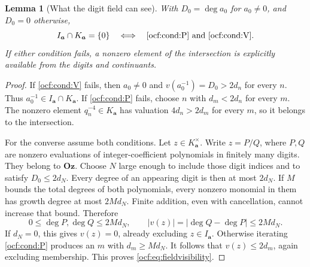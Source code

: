 \documentclass[11pt,a4paper]{article}
\numberwithin{equation}{section}
\newtheorem{lemma}[theorem]{Lemma}
\theoremstyle{definition}
\theoremstyle{remark}
\newcommand{\Oz}{\mathbf{Oz}}
\newcommand{\dgr}{\operatorname{deg}}
\newcommand{\codea}{\boldsymbol a}
\begin{document}
\begin{lemma}[What the digit field can see]\label{ocf:lem:digitfield}
With $D_0=\dgr a_0$ for $a_0\ne0$, and $D_0=0$ otherwise,
\begin{equation}\label{ocf:eq:fieldvisibility}
 I_{\codea}\cap K_{\codea}=\{0\}
 \quad\Longleftrightarrow\quad
 \eqref{ocf:cond:P}\text{ and }\eqref{ocf:cond:V}.
\end{equation}
If either condition fails, a nonzero element of the intersection is
explicitly available from the digits and continuants.
\end{lemma}
\begin{proof}
If \eqref{ocf:cond:V} fails, then $a_0\ne0$ and
$v(a_0^{-1})=D_0>2d_n$ for every $n$. Thus $a_0^{-1}\in I_{\codea}\cap
K_{\codea}$.
If \eqref{ocf:cond:P} fails, choose $n$ with $d_m<2d_n$ for every $m$.
The nonzero element $q_n^{-4}\in K_{\codea}$ has valuation $4d_n>2d_m$
for every $m$, so it belongs to the intersection.

For the converse assume both conditions. Let $z\in K_{\codea}^\times$.
Write $z=P/Q$, where $P,Q$ are nonzero evaluations of integer-coefficient
polynomials in finitely many digits. They belong to $\Oz$. Choose $N$
large enough to include those digit indices and to satisfy $D_0\le2d_N$.
Every degree of an appearing digit is then at most $2d_N$.
If $M$ bounds the total degrees of both polynomials, every nonzero
monomial in them has growth degree at most $2Md_N$. Finite addition,
even with cancellation, cannot increase that bound. Therefore
\[
 0\le\dgr P,\dgr Q\le2Md_N,
 \qquad |v(z)|=|\dgr Q-\dgr P|\le2Md_N.
\]
If $d_N=0$, this gives $v(z)=0$, already excluding $z\in I_{\codea}$.
Otherwise iterating \eqref{ocf:cond:P} produces an $m$ with
$d_m\ge M d_N$. It follows that $v(z)\le2d_m$, again excluding membership.
This proves \eqref{ocf:eq:fieldvisibility}.
\end{proof}
\end{document}
